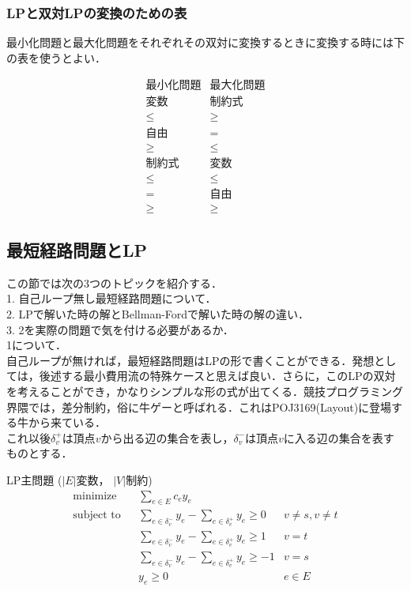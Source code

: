 \documentclass[13pt, a4paper, landscape]{jarticle}
\theoremstyle{nonitalic} %
\begin{document}
\subsubsection{LPと双対LPの変換のための表}

最小化問題と最大化問題をそれぞれその双対に変換するときに変換する時には下の表を使うとよい．

\begin{equation*}
\begin{array}{c|c}
  \textrm{最小化問題} &  \textrm{最大化問題} \\ \hline \hline
  \textrm{変数} &  \textrm{制約式} \\ \hline
  \leq & \geq \\
  \textrm{自由} & = \\
  \geq & \leq \\ \hline \hline
  \textrm{制約式} & \textrm{変数} \\ \hline
  \leq & \leq \\
   =   & \textrm{自由} \\
  \geq & \geq
\end{array}
\end{equation*}


\subsection{最短経路問題とLP}

この節では次の3つのトピックを紹介する． \\
1. 自己ループ無し最短経路問題について． \\
2. LPで解いた時の解とBellman-Fordで解いた時の解の違い．\\
3. 2を実際の問題で気を付ける必要があるか．
\\

1について．\\
自己ループが無ければ，最短経路問題はLPの形で書くことができる．発想としては，後述する最小費用流の特殊ケースと思えば良い．さらに，このLPの双対を考えることができ，かなりシンプルな形の式が出てくる．競技プログラミング界隈では，差分制約，俗に牛ゲーと呼ばれる．これはPOJ3169(Layout)に登場する牛から来ている． \\

これ以後$\delta_{v}^+$は頂点$v$から出る辺の集合を表し，$\delta_{v}^-$は頂点$v$に入る辺の集合を表すものとする．

LP主問題
($|E|$変数， $|V|$制約)
\begin{align}
 &&&&&\textrm{minimize}   && \sum_{e  \in E} c_e y_e \\
 &&&&&\textrm{subject to} && \sum_{e \in \delta_v^- } y_e - \sum_{e \in \delta_v^+} y_e \geq 0 & v\neq s, v\neq t  &&&&&\\
 &&&&&                    && \sum_{e \in \delta_v^- } y_e - \sum_{e \in \delta_v^+} y_e \geq 1 & v = t  &&&&&\\
 &&&&&                    && \sum_{e \in \delta_v^- } y_e - \sum_{e \in \delta_v^+} y_e \geq -1 & v = s  &&&&&\\
 &&&&&                    &&  y_e \geq 0 & e \in E&&&&&
\end{align}
\end{document}
